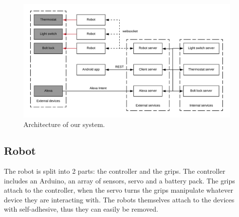 \documentclass[onecolumn]{IEEEtran}
\begin{document}
\begin{figure}
    \centering
    \includegraphics[width=1.0\linewidth]{architecture.png}
    \caption{Architecture of our system.}
\end{figure}

\subsection{Robot}

The robot is split into 2 parts: the controller and the grips. The controller includes an Arduino, an array of sensors, servo and a battery pack. The grips attach to the controller, when the servo turns the grips manipulate whatever device they are interacting with. The robots themselves attach to the devices with self-adhesive, thus they can easily be removed.
\end{document}
